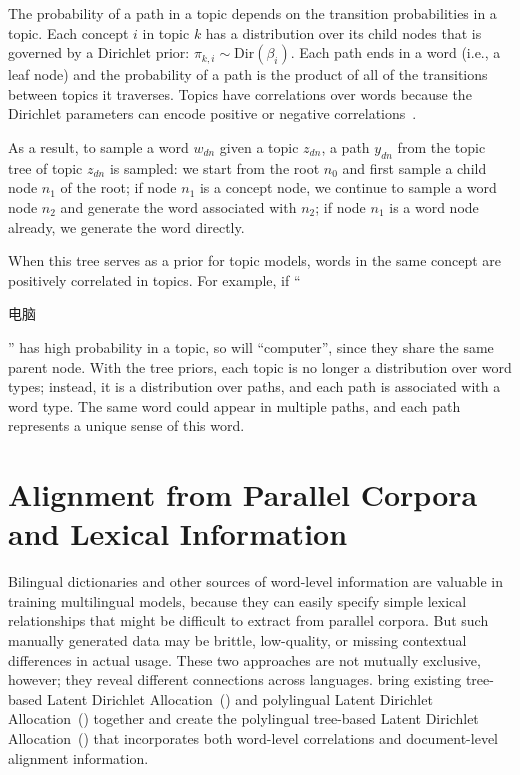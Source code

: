 The probability of a path in a topic depends on the transition
probabilities in a topic.  Each concept $i$ in topic $k$ has a
distribution over its child nodes that is governed by a Dirichlet prior:
$\pi_{k,i} \sim \text{Dir}(\beta_{i})$.  Each path ends in a word
(i.e., a leaf node) and the probability of a path is the product of
all of the transitions between topics it traverses. Topics have
correlations over words because the Dirichlet parameters can encode
positive or negative correlations~\citep{andrzejewski-09}.

As a result, to sample a word $w_{dn}$ given a topic $z_{dn}$, a path
$y_{dn}$ from the topic tree of topic $z_{dn}$ is sampled: we start
from the root $n_0$ and first sample a child node $n_1$ of the root;
if node $n_1$ is a concept node, we continue to sample a word node
$n_2$ and generate the word associated with $n_2$; if node $n_1$ is a
word node already, we generate the word directly.

When this tree serves as a prior for topic models, words in the same
concept are positively correlated in topics.  For example, if
``\begin{CJK*}{UTF8}{gbsn}电脑\end{CJK*}'' has high probability in a
  topic, so will ``computer'', since they share the same parent
  node. With the tree priors, each topic is no longer a distribution
  over word types; instead, it is a distribution over paths, and each
  path is associated with a word type.  The same word could appear in
  multiple paths, and each path represents a unique sense of this
  word.

\section{Alignment from Parallel Corpora and Lexical Information}

Bilingual dictionaries and other sources of word-level information are 
valuable in training multilingual models, because they can easily specify 
simple lexical relationships that might be difficult to extract from parallel corpora.
But such manually generated data may be brittle, low-quality, or missing contextual differences in actual usage.
These two approaches are not mutually exclusive, however; they reveal
different connections across languages. \citet{hu-14} bring existing
tree-based Latent Dirichlet Allocation~(\tlda{}) and polylingual Latent Dirichlet 
Allocation~(\plda{}) together and create the polylingual tree-based Latent Dirichlet 
Allocation~(\ptlda{}) that incorporates both word-level correlations and
document-level alignment information.

